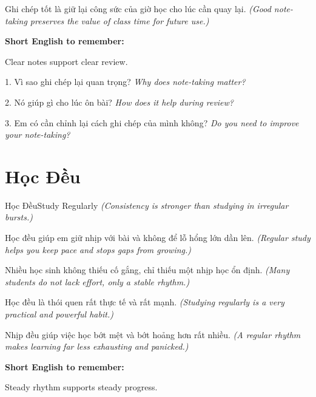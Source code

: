 \begin{baihoc}
Ghi chép tốt là giữ lại công sức của giờ học cho lúc cần quay lại.
\textit{(Good note-taking preserves the value of class time for future use.)}
\end{baihoc}

\begin{ghinhoanh}
\textbf{Short English to remember:}

Clear notes support clear review.

\end{ghinhoanh}

\begin{tuhocnhanh}
1. Vì sao ghi chép lại quan trọng? \textit{Why does note-taking matter?}

2. Nó giúp gì cho lúc ôn bài? \textit{How does it help during review?}

3. Em có cần chỉnh lại cách ghi chép của mình không? \textit{Do you need to improve your note-taking?}
\end{tuhocnhanh}
\ngancach

\section{Học Đều}
\begin{truyen}{Học Đều}{Study Regularly}
\textit{(Consistency is stronger than studying in irregular bursts.)}

Học đều giúp em giữ nhịp với bài và không để lỗ hổng lớn dần lên.
\textit{(Regular study helps you keep pace and stops gaps from growing.)}

Nhiều học sinh không thiếu cố gắng, chỉ thiếu một nhịp học ổn định.
\textit{(Many students do not lack effort, only a stable rhythm.)}

Học đều là thói quen rất thực tế và rất mạnh.
\textit{(Studying regularly is a very practical and powerful habit.)}
\end{truyen}

\begin{baihoc}
Nhịp đều giúp việc học bớt mệt và bớt hoảng hơn rất nhiều.
\textit{(A regular rhythm makes learning far less exhausting and panicked.)}
\end{baihoc}

\begin{ghinhoanh}
\textbf{Short English to remember:}

Steady rhythm supports steady progress.

\end{ghinhoanh}

